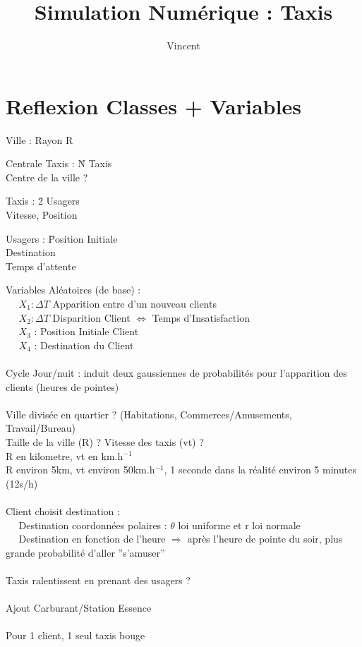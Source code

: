 \documentclass[11pt]{article} %
\title{Simulation Numérique : Taxis}
\author{Vincent}
\begin{document}
\maketitle

\section*{Reflexion Classes + Variables}

Ville : Rayon R \\
\begin{tabbing}
Centrale Taxis : \= N Taxis \\
\> Centre de la ville ? 
\end{tabbing}
\begin{tabbing}
Taxis : \= 2 Usagers \\
\> Vitesse, Position \\
\end{tabbing}
\begin{tabbing}
Usagers : \= Position Initiale \\
\> Destination \\
\> Temps d'attente \\
\end{tabbing}
Variables Aléatoires (de base) : \\
$~~~~~~X_{1}: \Delta T$ Apparition entre d'un nouveau clients \\
$~~~~~~X_{2} : \Delta T$ Disparition Client $\Leftrightarrow$ Temps d'Insatisfaction \\
$~~~~~~X_{3}$ : Position Initiale Client  \\
$~~~~~~X_{4}$ : Destination du Client \\
\\
Cycle Jour/nuit : induit deux gaussiennes de probabilités pour l'apparition des clients (heures de pointes) \\
\\
Ville divisée en quartier ? (Habitations, Commerces/Amusements, Travail/Bureau) \\
Taille de la ville (R) ? Vitesse des taxis (vt) ?\\
R en kilometre, vt en km.h$^{-1}$\\
R environ 5km, vt environ 50km.h$^{-1}$, 1 seconde dans la réalité environ 5 minutes (12s/h)\\
\\
Client choisit destination : \\
$~~~~~~$Destination coordonnées polaires : $\theta$ loi uniforme et r loi normale \\
$~~~~~~$Destination en fonction de l'heure $\Rightarrow$ après l'heure de pointe du soir,  plus grande probabilité d'aller ''s'amuser'' \\
\\
Taxis ralentissent en prenant des usagers ?\\
\\
Ajout Carburant/Station Essence \\
\\
Pour 1 client, 1 seul taxis bouge\\
\\ \\ \\ \\
\end{document}
